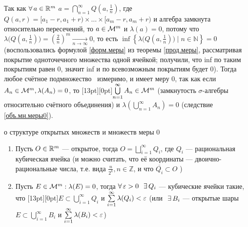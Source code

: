 \begin{zam}[https://www.youtube.com/live/FFhHi8qwuDM?si=E6XVbmkMiVfJAmNk&t=6897]
	Так как $\forall \, a \in \mathbb R^m$ $a = \bigcap\limits_{n = 1}^\infty Q(a, \frac 1n)$, где $Q(a, r) = [a_1 - r, a_1 + r) \times \ldots \times [a_m - r, a_m + r)$ и алгебра замкнута относительно пересечений, то $a \in \mathcal{M}^m$ и $\lambda(a) = 0$, потому что $\lambda\bigl(Q(a, \frac 1n)\bigr) = \left(\frac 2n\right)^m \xrightarrow[n \to \infty]{} 0$, то есть $\inf\left\{\lambda\bigl(Q(a, \frac 1n)\bigr) \mid n \in \mathbb{N}\right\} = 0$ (воспользовались формулой \ref{форм.меры} из теоремы \ref{прод.меры}, рассматривая покрытие одноточечного множества одной ячейкой; получили, что inf по таким покрытиям равен 0, значит inf и по всевозможным покрытиям будет 0). Тогда любое счётное подмножество \rmm\ измеримо, и имеет меру 0, так как если $A_n \in \mathcal{M}^m, \lambda(A_n) = 0$, то \raisebox{0pt}[13pt][0pt]{$\bigcup\limits_{n = 1}^\infty A_n \in \mathcal{M}^m$} (замкнутость $\sigma$-алгебры относительно счётного объединения) и $\lambda\left(\bigcup\limits_{n = 1}^\infty A_n\right) = 0$ (следствие \ref{объ.мн.меры0}).
\end{zam}

\begin{lem}[https://www.youtube.com/live/FFhHi8qwuDM?si=01lanTvQNSo3S87X&t=7279]{о структуре открытых множеств и множеств меры 0}
	\vspace{-20pt}
	\begin{enumerate}\makeatletter\renewcommand{\p@enumi}{\thelem.}\makeatother
		\item\label{изм.откр.мн.} Пусть $O \in \mathbb R^m$ --- открытое, тогда $O = \bigsqcup\limits_{i = 1}^\infty Q_i$, где $Q_i$ --- рациональная кубическая ячейка (и можно считать, что её координаты --- двоично-рациональные числа, т.е. вида $\frac{n}{2^k}, n \in \mathbb{Z}$, и что $\overline{Q_i} \subset O$ ) 
		
		\item \label{стр.мн.мер.0} Пусть $E \in \mathcal{M}^m : \lambda(E) = 0$, тогда $\A \eps > 0 \E Q_i$ --- кубические ячейки такие, что \raisebox{0pt}[13pt][0pt]{$E \subset \bigcup\limits_{i = 1}^\infty Q_i$} и $\sum\limits_{i = 1}^\infty\lambda(Q_i) < \varepsilon$ (или$\E B_i$ --- открытые шары $E \subset \bigcup\limits_{i = 1}^\infty B_i$ и $\sum\limits_{i = 1}^\infty\lambda(B_i) < \varepsilon$)
	\end{enumerate}
\end{lem}

